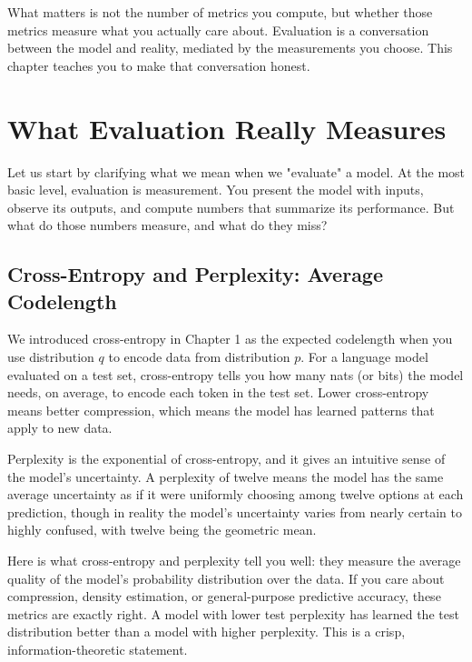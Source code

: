 \vspace{0.3cm}

What matters is not the number of metrics you compute, but whether those metrics measure what you actually care about. Evaluation is a conversation between the model and reality, mediated by the measurements you choose. This chapter teaches you to make that conversation honest.

\vspace{2em}

\section{What Evaluation Really Measures}

Let us start by clarifying what we mean when we "evaluate" a model. At the most basic level, evaluation is measurement. You present the model with inputs, observe its outputs, and compute numbers that summarize its performance. But what do those numbers measure, and what do they miss?

\vspace{1em}

\subsection{Cross-Entropy and Perplexity: Average Codelength}

We introduced cross-entropy in Chapter 1 as the expected codelength when you use distribution $q$ to encode data from distribution $p$. For a language model evaluated on a test set, cross-entropy tells you how many nats (or bits) the model needs, on average, to encode each token in the test set. Lower cross-entropy means better compression, which means the model has learned patterns that apply to new data.

\vspace{0.3cm}

Perplexity is the exponential of cross-entropy, and it gives an intuitive sense of the model's uncertainty. A perplexity of twelve means the model has the same average uncertainty as if it were uniformly choosing among twelve options at each prediction, though in reality the model's uncertainty varies from nearly certain to highly confused, with twelve being the geometric mean.

\vspace{0.3cm}

Here is what cross-entropy and perplexity tell you well: they measure the average quality of the model's probability distribution over the data. If you care about compression, density estimation, or general-purpose predictive accuracy, these metrics are exactly right. A model with lower test perplexity has learned the test distribution better than a model with higher perplexity. This is a crisp, information-theoretic statement.

